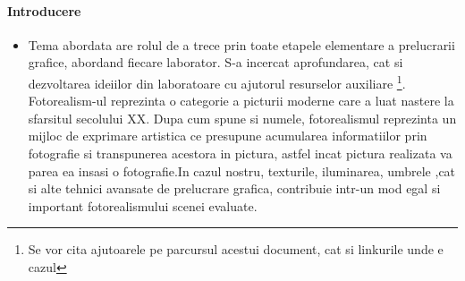 \newcommand\tab[1][1cm]{\hspace*{#1}}
\graphicspath{ {images/} }
\paragraph{Introducere}

\begin{itemize}
\item
	\tab Tema abordata are rolul de a trece prin toate etapele elementare a prelucrarii grafice, abordand fiecare laborator. S-a incercat aprofundarea,  cat si dezvoltarea ideiilor din laboratoare cu ajutorul resurselor auxiliare \footnote{Se vor cita ajutoarele pe parcursul acestui document, cat si linkurile unde e cazul}. \\
	\tab Fotorealism-ul reprezinta o categorie a picturii moderne care a luat nastere la sfarsitul secolului XX. Dupa cum spune si numele, fotorealismul reprezinta un mijloc de exprimare artistica ce presupune acumularea informatiilor prin fotografie si transpunerea acestora in pictura, astfel incat pictura realizata va parea ea insasi o fotografie.In cazul nostru, texturile, iluminarea, umbrele ,cat si alte tehnici avansate de prelucrare grafica, contribuie intr-un mod egal si important fotorealismului scenei evaluate.\\
\end{itemize}